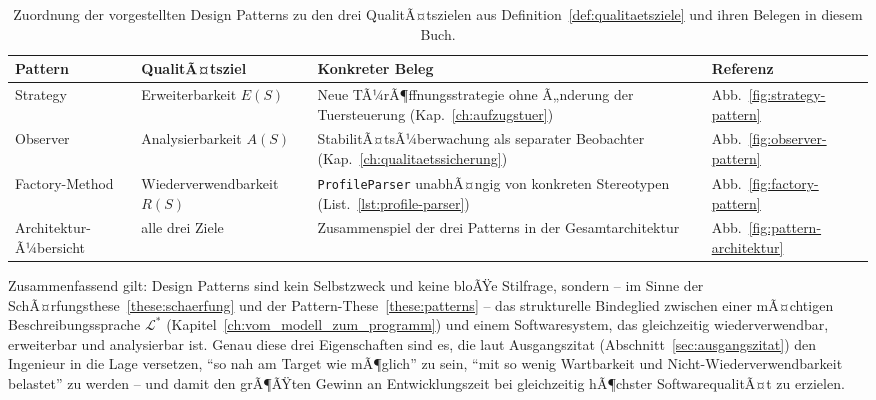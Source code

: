 ﻿\documentclass[a4paper,12pt]{report}
\theoremstyle{definition}
\begin{document}
\begin{table}[H]
\centering
\footnotesize
\begin{tabular}{@{}>{\raggedright\arraybackslash}p{2.0cm}>{\raggedright\arraybackslash}p{2.9cm}>{\raggedright\arraybackslash}p{5.0cm}>{\raggedright\arraybackslash}p{2.3cm}@{}}
\toprule
\textbf{Pattern} & \textbf{QualitÃ¤tsziel} & \textbf{Konkreter Beleg} & \textbf{Referenz} \\
\midrule
Strategy & Erweiterbarkeit $E(S)$ & Neue TÃ¼rÃ¶ffnungsstrategie ohne Ã„nderung der Tuersteuerung (Kap.~\ref{ch:aufzugstuer}) & Abb.~\ref{fig:strategy-pattern} \\
Observer & Analysierbarkeit $A(S)$ & StabilitÃ¤tsÃ¼berwachung als separater Beobachter (Kap.~\ref{ch:qualitaetssicherung}) & Abb.~\ref{fig:observer-pattern} \\
Factory-\linebreak Method & Wieder\-ver\-wend\-bar\-keit $R(S)$ & \texttt{ProfileParser} unabhÃ¤ngig von konkreten Stereotypen (List.~\ref{lst:profile-parser}) & Abb.~\ref{fig:factory-pattern} \\
Architektur-\linebreak Ã¼bersicht & alle drei Ziele & Zusammenspiel der drei Patterns in der Gesamtarchitektur & Abb.~\ref{fig:pattern-architektur} \\
\bottomrule
\end{tabular}
\caption{Zuordnung der vorgestellten Design Patterns zu den drei
QualitÃ¤tszielen aus Definition~\ref{def:qualitaetsziele} und ihren Belegen
in diesem Buch.}
\label{tab:pattern-wirkung}
\end{table}

\noindent
Zusammenfassend gilt: Design Patterns sind kein Selbstzweck und keine bloÃŸe
Stilfrage, sondern -- im Sinne der SchÃ¤rfungsthese~\ref{these:schaerfung} und der
Pattern-These~\ref{these:patterns} -- das strukturelle Bindeglied zwischen einer
mÃ¤chtigen Beschreibungssprache $\mathcal{L}^*$ (Kapitel~\ref{ch:vom_modell_zum_programm})
und einem Softwaresystem, das gleichzeitig wiederverwendbar, erweiterbar und
analysierbar ist. Genau diese drei Eigenschaften sind es, die laut
Ausgangszitat (Abschnitt~\ref{sec:ausgangszitat}) den Ingenieur in die Lage
versetzen, ``so nah am Target wie mÃ¶glich'' zu sein, ``mit so wenig Wartbarkeit
und Nicht-Wiederverwendbarkeit belastet'' zu werden -- und damit den grÃ¶ÃŸten
Gewinn an Entwicklungszeit bei gleichzeitig hÃ¶chster SoftwarequalitÃ¤t zu
erzielen.

\end{document}
